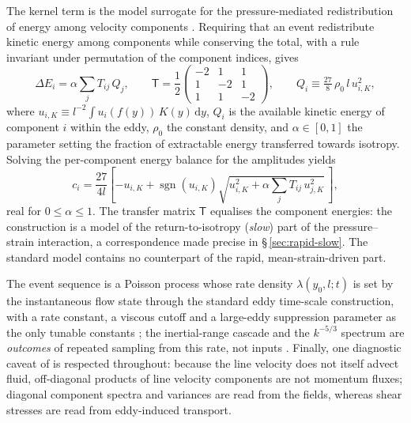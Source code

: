 \documentclass[11pt,a4paper]{article}
\begin{document}
The kernel term is the model surrogate for the pressure-mediated
redistribution of energy among velocity components
\citep{WunschKerstein2001,Kerstein2001}. Requiring that an event
redistribute kinetic energy among components while conserving the total,
with a rule invariant under permutation of the component indices, gives
\begin{equation}
  \Delta E_i = \alpha\sum_j T_{ij}\,Q_j,
  \qquad
  \mathsf{T}=\frac{1}{2}
  \begin{pmatrix}
    -2 & 1 & 1\\ 1 & -2 & 1\\ 1 & 1 & -2
  \end{pmatrix},
  \qquad
  Q_i\equiv\tfrac{27}{8}\,\rho_0\, l\, u_{i,K}^2,
  \label{eq:redistribution}
\end{equation}
where $u_{i,K}\equiv l^{-2}\!\int u_i(f(y))\,K(y)\,\mathrm{d}y$, $Q_i$ is
the available kinetic energy of component $i$ within the eddy, $\rho_0$
the constant density, and $\alpha\in[0,1]$ the parameter setting the
fraction of extractable energy transferred towards isotropy. Solving the
per-component energy balance for the amplitudes yields
\begin{equation}
  c_i = \frac{27}{4l}\left[-u_{i,K}
        +\operatorname{sgn}(u_{i,K})
        \sqrt{u_{i,K}^2+\alpha\sum_j T_{ij}\,u_{j,K}^2}\,\right],
  \label{eq:ci}
\end{equation}
real for $0\le\alpha\le1$. The transfer matrix $\mathsf{T}$ equalises the
component energies: the construction is a model of the
return-to-isotropy (\emph{slow}) part of the pressure--strain
interaction, a correspondence made precise in \S\,\ref{sec:rapid-slow}.
The standard model contains no counterpart of the rapid,
mean-strain-driven part.

The event sequence is a Poisson process whose rate density
$\lambda(y_0,l;t)$ is set by the instantaneous flow state through the
standard eddy time-scale construction, with a rate constant, a viscous
cutoff and a large-eddy suppression parameter as the only tunable
constants \citep{Kerstein1999,StephensLignell2021}; the inertial-range
cascade and the $k^{-5/3}$ spectrum are \emph{outcomes} of repeated
sampling from this rate, not inputs \citep{Kerstein1999}. Finally, one
diagnostic caveat of \citet{Kerstein2001} is respected throughout:
because the line velocity does not itself advect fluid, off-diagonal
products of line velocity components are not momentum fluxes; diagonal
component spectra and variances are read from the fields, whereas shear
stresses are read from eddy-induced transport.
\end{document}
